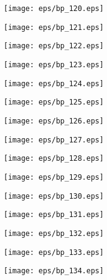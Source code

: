 \documentclass{book}
\begin{document}
	\clearpage\begin{figure}[p]
    \centering
	\texttt{[image: eps/bp\_120.eps]}
	\end{figure}
	\clearpage\begin{figure}[p]
    \centering
	\texttt{[image: eps/bp\_121.eps]}
	\end{figure}
	\clearpage\begin{figure}[p]
    \centering
	\texttt{[image: eps/bp\_122.eps]}
	\end{figure}
	\clearpage\begin{figure}[p]
    \centering
	\texttt{[image: eps/bp\_123.eps]}
	\end{figure}
	\clearpage\begin{figure}[p]
    \centering
	\texttt{[image: eps/bp\_124.eps]}
	\end{figure}
	\clearpage\begin{figure}[p]
    \centering
	\texttt{[image: eps/bp\_125.eps]}
	\end{figure}
	\clearpage\begin{figure}[p]
    \centering
	\texttt{[image: eps/bp\_126.eps]}
	\end{figure}
	\clearpage\begin{figure}[p]
    \centering
	\texttt{[image: eps/bp\_127.eps]}
	\end{figure}
	\clearpage\begin{figure}[p]
    \centering
	\texttt{[image: eps/bp\_128.eps]}
	\end{figure}
	\clearpage\begin{figure}[p]
    \centering
	\texttt{[image: eps/bp\_129.eps]}
	\end{figure}
	\clearpage\begin{figure}[p]
    \centering
	\texttt{[image: eps/bp\_130.eps]}
	\end{figure}
	\clearpage\begin{figure}[p]
    \centering
	\texttt{[image: eps/bp\_131.eps]}
	\end{figure}
	\clearpage\begin{figure}[p]
    \centering
	\texttt{[image: eps/bp\_132.eps]}
	\end{figure}
	\clearpage\begin{figure}[p]
    \centering
	\texttt{[image: eps/bp\_133.eps]}
	\end{figure}
	\clearpage\begin{figure}[p]
    \centering
	\texttt{[image: eps/bp\_134.eps]}
	\end{figure}
\end{document}
